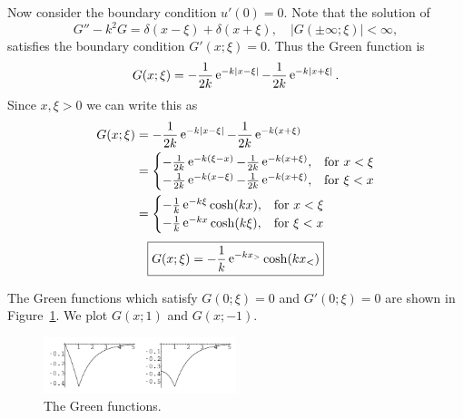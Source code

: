 {\begin{Solution}
  Now consider the boundary condition $u'(0) = 0$.  Note that the solution of
  \[
  G'' - k^2 G = \delta(x-\xi) + \delta(x+\xi), \quad |G(\pm\infty;\xi)| < \infty,
  \]
  satisfies the boundary condition $G'(x;\xi) = 0$.  Thus the Green function is
  \[
  G(x;\xi) = - \frac{1}{2k} \mathop{\mathrm{e}}\nolimits^{-k |x-\xi|} - \frac{1}{2k} \mathop{\mathrm{e}}\nolimits^{-k |x+\xi|}.
  \]
  Since $x,\xi > 0$ we can write this as
  \begin{align*}
    G(x;\xi) &= - \frac{1}{2k} \mathop{\mathrm{e}}\nolimits^{-k |x-\xi|} - \frac{1}{2k} \mathop{\mathrm{e}}\nolimits^{-k (x+\xi)} \\
    &= \begin{cases}
      - \frac{1}{2k} \mathop{\mathrm{e}}\nolimits^{-k (\xi-x)} - \frac{1}{2k} \mathop{\mathrm{e}}\nolimits^{-k (x+\xi)},
      &\mathrm{for}\ x < \xi \\
      - \frac{1}{2k} \mathop{\mathrm{e}}\nolimits^{-k (x-\xi)} - \frac{1}{2k} \mathop{\mathrm{e}}\nolimits^{-k (x+\xi)},
      &\mathrm{for}\ \xi < x 
    \end{cases} \\
    &= \begin{cases}
      - \frac{1}{k} \mathop{\mathrm{e}}\nolimits^{-k \xi} \cosh(k x), &\mathrm{for}\ x < \xi \\
      - \frac{1}{k} \mathop{\mathrm{e}}\nolimits^{-k x} \cosh(k \xi), &\mathrm{for}\ \xi < x 
    \end{cases} \\
  \end{align*}
  \[
  \boxed{
    G(x;\xi) = - \frac{1}{k} \mathop{\mathrm{e}}\nolimits^{-k x_>} \cosh(k x_<)
    }
  \]

  The Green functions which satisfy $G(0;\xi) = 0$ and $G'(0;\xi) = 0$ 
  are shown in Figure~\ref{helmholtz1}.  We plot $G(x;1)$ and $G(x;-1)$.

  \begin{figure}[tb!]
    \begin{center}
      \includegraphics[width=0.5\textwidth]{ode/inhomogeneous/helmholtz1}
    \end{center}
    \caption{The Green functions.}
    \label{helmholtz1}
  \end{figure}
\end{Solution}






}

